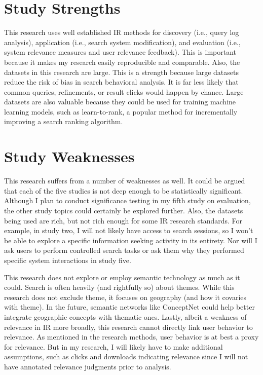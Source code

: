 \section{Study Strengths}

This research uses well established IR methods for discovery (i.e., query log analysis), application (i.e., search system modification), and evaluation (i.e., system relevance measures and user relevance feedback). This is important because it makes my research easily reproducible and comparable. Also, the datasets in this research are large. This is a strength because large datasets reduce the risk of bias in search behavioral analysis. It is far less likely that common queries, refinements, or result clicks would happen by chance. Large datasets are also valuable because they could be used for training machine learning models, such as learn-to-rank, a popular method for incrementally improving a search ranking algorithm.

\section{Study Weaknesses}

This research suffers from a number of weaknesses as well. It could be argued that each of the five studies is not deep enough to be statistically significant. Although I plan to conduct significance testing in my fifth study on evaluation, the other study topics could certainly be explored further. Also, the datasets being used are rich, but not rich enough for some IR research standards. For example, in study two, I will not likely have access to search sessions, so I won’t be able to explore a specific information seeking activity in its entirety. Nor will I ask users to perform controlled search tasks or ask them why they performed specific system interactions in study five.

This research does not explore or employ semantic technology as much as it could. Search is often heavily (and rightfully so) about themes. While this research does not exclude theme, it focuses on geography (and how it covaries with theme). In the future, semantic networks like ConceptNet could help better integrate geographic concepts with thematic ones. Lastly, albeit a weakness of relevance in IR more broadly, this research cannot directly link user behavior to relevance. As mentioned in the research methods, user behavior is at best a proxy for relevance. But in my research, I will likely have to make additional assumptions, such as clicks and downloads indicating relevance since I will not have annotated relevance judgments prior to analysis.